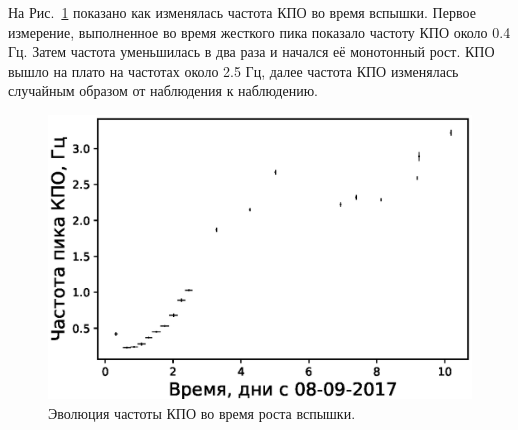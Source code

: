 \documentclass{pazhb}
\begin{document}
На Рис.~\ref{fig:qpoevol} показано как изменялась частота КПО во время вспышки. Первое измерение, выполненное во время жесткого пика показало частоту КПО около 0.4 Гц. Затем частота уменьшилась в два раза и начался её монотонный рост. КПО вышло на плато на частотах около 2.5 Гц, далее частота КПО изменялась случайным образом от наблюдения к наблюдению.


\begin{figure}
\centerline{\includegraphics[width=\linewidth]{QPO_evo2.eps}}
\caption{Эволюция частоты КПО во время роста вспышки.}
\label{fig:qpoevol}
\end{figure}
\end{document}

